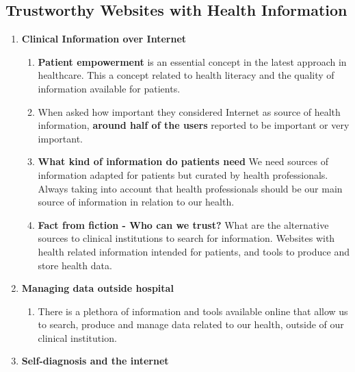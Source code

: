 \documentclass[10pt, twoside]{article}   	%
\begin{document}
\subsection{Trustworthy Websites with Health Information}
\begin{enumerate}
\item \textbf{Clinical Information over Internet }
    \begin{enumerate}
        \item \textbf{Patient empowerment} is an essential concept in the latest approach in healthcare. This a concept related to health literacy and the quality of information available for patients.
        \item When asked how important they considered Internet as source of health information, \textbf{ around half of the users} reported to be important or very important.
        \item \textbf{What kind of information do patients need} We need sources of information adapted for patients but curated by health professionals. Always taking into account that health professionals should be our main source of information in relation to our health.
        \item \textbf{Fact from fiction - Who can we trust?} What are the alternative sources to clinical institutions to search for information. Websites with health related information intended for patients, and tools to produce and store health data.     
     \end{enumerate}
\item \textbf{Managing data outside hospital }
    \begin{enumerate}
        \item There is a plethora of information and tools available online that allow us to search, produce and manage data related to our health, outside of our clinical institution.
    \end{enumerate}
\item \textbf{Self-diagnosis and the internet}
    \end{enumerate}
\end{document}
